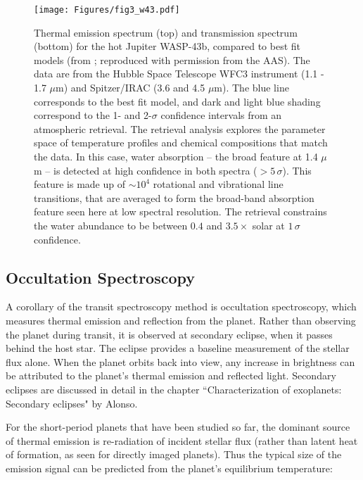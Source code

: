 \documentclass[graybox,natbib,nosecnum]{svmult}
\begin{document}
\begin{figure}
\begin{centering}
\texttt{[image: Figures/fig3\_w43.pdf]}
\caption{Thermal emission spectrum (top) and transmission spectrum (bottom) for the hot Jupiter WASP-43b, compared to best fit models (from \citealt{kreidberg15b}; reproduced with permission from the AAS). The data are from the Hubble Space Telescope WFC3 instrument (1.1 - 1.7 $\mu$m) and Spitzer/IRAC (3.6 and 4.5 $\mu$m). The blue line corresponds to the best fit model, and dark and light blue shading correspond to the 1- and 2-$\sigma$ confidence intervals from an atmospheric retrieval. The retrieval analysis explores the parameter space of temperature profiles and chemical compositions that match the data. In this case, water absorption -- the broad feature at 1.4 $\mu$m -- is detected at high confidence in both spectra ($>5\,\sigma$). This feature is made up of $\sim10^4$ rotational and vibrational line transitions, that are averaged to form the broad-band absorption feature seen here at low spectral resolution. The retrieval constrains the water abundance to be between $0.4$ and $3.5\times$ solar at $1\,\sigma$ confidence.} 
\label{fig:spectra}       
\end{centering}
\end{figure}


\subsection{Occultation Spectroscopy}
A corollary of the transit spectroscopy method is occultation spectroscopy, which measures thermal emission and reflection from the planet. Rather than observing the planet during transit, it is observed at secondary eclipse, when it passes behind the host star. The eclipse provides a baseline measurement of the stellar flux alone. When the planet orbits back into view, any increase in brightness can be attributed to the planet's thermal emission and reflected light. Secondary eclipses are discussed in detail in the chapter ``Characterization of exoplanets: Secondary eclipses" by Alonso.

For the short-period planets that have been studied so far, the dominant source of thermal emission is re-radiation of incident stellar flux (rather than latent heat of formation, as seen for directly imaged planets). Thus the typical size of the emission signal can be predicted from the planet's equilibrium temperature:
\end{document}
